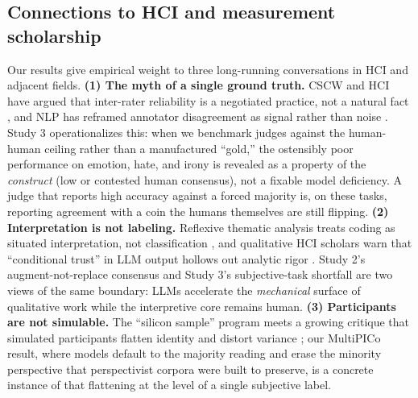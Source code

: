 \subsection{Connections to HCI and measurement scholarship}
Our results give empirical weight to three long-running conversations in HCI and adjacent fields.
\textbf{(1) The myth of a single ground truth.} CSCW and HCI have argued that inter-rater reliability is a negotiated
practice, not a natural fact \citep{mcdonald2019reliability}, and NLP has reframed annotator disagreement as
signal rather than noise \citep{aroyo2015truth,plank2022humanlabel}. Study 3 operationalizes this: when we benchmark
judges against the human-human ceiling rather than a manufactured ``gold,'' the ostensibly poor performance on
emotion, hate, and irony is revealed as a property of the \emph{construct} (low or contested human consensus), not a
fixable model deficiency. A judge that reports high accuracy against a forced majority is, on these tasks, reporting
agreement with a coin the humans themselves are still flipping.
\textbf{(2) Interpretation is not labeling.} Reflexive thematic analysis treats coding as situated interpretation,
not classification \citep{braun2006thematic}, and qualitative HCI scholars warn that ``conditional trust'' in LLM
output hollows out analytic rigor \citep{schroeder2025usestensions,davison2024ethics}. Study 2's augment-not-replace
consensus and Study 3's subjective-task shortfall are two views of the same boundary: LLMs accelerate the
\emph{mechanical} surface of qualitative work while the interpretive core remains human.
\textbf{(3) Participants are not simulable.} The ``silicon sample'' program \citep{argyle2023outofone} meets a
growing critique that simulated participants flatten identity and distort variance
\citep{wang2024flatten,cheng2023compost,bisbee2023perils,salminen2025syntheticcritical}; our MultiPICo result, where
models default to the majority reading and erase the minority perspective that perspectivist corpora were built to
preserve, is a concrete instance of that flattening at the level of a single subjective label.

